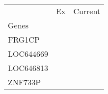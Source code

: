 \begin{tabular}{lcc}
\toprule
{} & Ex & Current \\
Genes     &    &         \\
\midrule
FRG1CP    &    &         \\
LOC644669 &    &         \\
LOC646813 &    &         \\
ZNF733P   &    &         \\
\bottomrule
\end{tabular}
